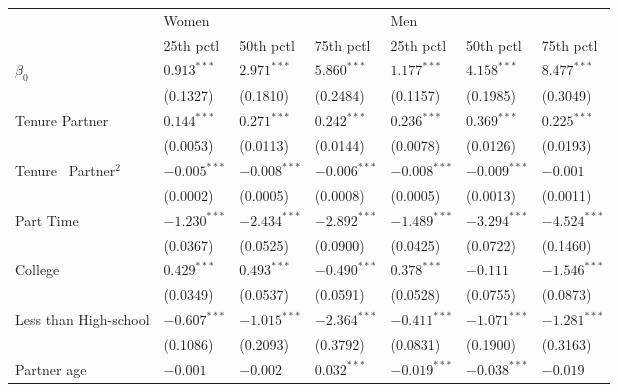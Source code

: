 \begin{tabular}{lllllll}
\toprule
{} & \multicolumn{3}{l}{Women} & \multicolumn{3}{l}{Men} \\
{} &       25th pctl &       50th pctl &       75th pctl &       25th pctl &       50th pctl &       75th pctl \\
\midrule
$\beta_0$                     &   $0.913^{***}$ &   $2.971^{***}$ &   $5.860^{***}$ &   $1.177^{***}$ &   $4.158^{***}$ &   $8.477^{***}$ \\
                              &        (0.1327) &        (0.1810) &        (0.2484) &        (0.1157) &        (0.1985) &        (0.3049) \\
Tenure Partner                &   $0.144^{***}$ &   $0.271^{***}$ &   $0.242^{***}$ &   $0.236^{***}$ &   $0.369^{***}$ &   $0.225^{***}$ \\
                              &        (0.0053) &        (0.0113) &        (0.0144) &        (0.0078) &        (0.0126) &        (0.0193) \\
Tenure \ Partner$^{2}$        &  $-0.005^{***}$ &  $-0.008^{***}$ &  $-0.006^{***}$ &  $-0.008^{***}$ &  $-0.009^{***}$ &        $-0.001$ \\
                              &        (0.0002) &        (0.0005) &        (0.0008) &        (0.0005) &        (0.0013) &        (0.0011) \\
Part Time                     &  $-1.230^{***}$ &  $-2.434^{***}$ &  $-2.892^{***}$ &  $-1.489^{***}$ &  $-3.294^{***}$ &  $-4.524^{***}$ \\
                              &        (0.0367) &        (0.0525) &        (0.0900) &        (0.0425) &        (0.0722) &        (0.1460) \\
College                       &   $0.429^{***}$ &   $0.493^{***}$ &  $-0.490^{***}$ &   $0.378^{***}$ &        $-0.111$ &  $-1.546^{***}$ \\
                              &        (0.0349) &        (0.0537) &        (0.0591) &        (0.0528) &        (0.0755) &        (0.0873) \\
Less than High-school         &  $-0.607^{***}$ &  $-1.015^{***}$ &  $-2.364^{***}$ &  $-0.411^{***}$ &  $-1.071^{***}$ &  $-1.281^{***}$ \\
                              &        (0.1086) &        (0.2093) &        (0.3792) &        (0.0831) &        (0.1900) &        (0.3163) \\
Partner age                   &        $-0.001$ &        $-0.002$ &   $0.032^{***}$ &  $-0.019^{***}$ &  $-0.038^{***}$ &        $-0.019$ \\

\end{tabular}
